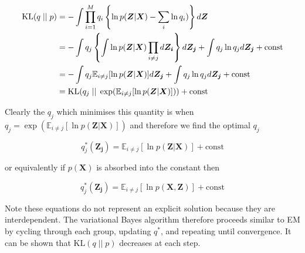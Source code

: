 \documentclass{article}
\begin{document}
\begin{align}
    \text{KL}(q\; ||\; p) &= -\int \prod_{i = 1}^M q_i \left\{ \ln p(\boldsymbol{Z} | \boldsymbol{X}) - \sum_i \ln q_i) \right\} d \boldsymbol{Z}\notag \\
    &= -\int q_j \left\{ \int \ln p(\boldsymbol{Z} | \boldsymbol{X}) \prod_{i \ne j} d \boldsymbol{Z_i} \right\} d \boldsymbol{Z_j} + \int q_j \ln q_j d \boldsymbol{Z_j} + \text{const}\notag\\
    &= -\int q_j \mathbb{E}_{i \ne j}[\ln p(\boldsymbol{Z} | \boldsymbol{X})] d \boldsymbol{Z_j} + \int q_j \ln q_j d \boldsymbol{Z_j} + \text{const}\notag\\
    &= \text{KL}(q_j\; ||\; \exp (\mathbb{E}_{i \ne j}[\ln p(\boldsymbol{Z} | \boldsymbol{X})])) + \text{const}
\end{align}

Clearly the $q_j$ which minimises this quantity is when $q_j = \exp(\mathbb{E}_{i \ne j}[\ln p(\boldsymbol{Z} | \boldsymbol{X})])$ and therefore we find the optimal $q_j$

\begin{equation}
q^*_j(\boldsymbol{Z_j}) = \mathbb{E}_{i \ne j}[\ln p(\boldsymbol{Z} | \boldsymbol{X})] + \text{const}
\end{equation}

or equivalently if $p(\boldsymbol{X})$ is absorbed into the constant then

\begin{equation}
\label{eq:q_opt}
q^*_j(\boldsymbol{Z_j}) = \mathbb{E}_{i \ne j}[\ln p(\boldsymbol{X}, \boldsymbol{Z})] + \text{const}
\end{equation}

Note these equations do not represent an explicit solution because they are interdependent. The variational Bayes algorithm therefore proceeds similar to EM by cycling through each group, updating $q^*$, and repeating until convergence. It can be shown that $\text{KL}(q\; ||\; p)$ decreases at each step.
\end{document}
